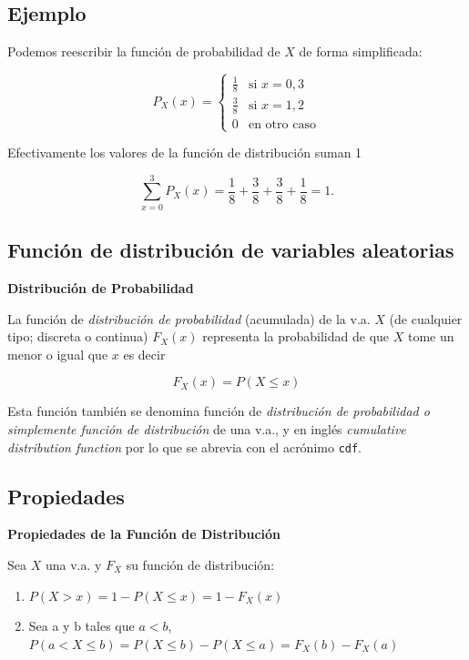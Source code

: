 \documentclass[]{book}
\providecommand{\tightlist}{%
  \setlength{\itemsep}{0pt}\setlength{\parskip}{0pt}}
\begin{document}
\hypertarget{ejemplo-10}{%
\subsection{Ejemplo}\label{ejemplo-10}}

Podemos reescribir la función de probabilidad de \(X\) de forma simplificada:

\[P_{X}(x)=\left\{\begin{array}{ll} \frac18 & \mbox{si } x=0, 3\\
\frac38 & \mbox{si } x=1,2\\ 0 & \mbox{en otro caso}\end{array}\right.\]

Efectivamente los valores de la función de distribución suman 1

\[\sum_{x=0}^3 P_X(x)= \frac18+\frac38+\frac38+\frac18=1.\]

\hypertarget{funciuxf3n-de-distribuciuxf3n-de-variables-aleatorias}{%
\subsection{Función de distribución de variables aleatorias}\label{funciuxf3n-de-distribuciuxf3n-de-variables-aleatorias}}

 \textbf{Distribución de Probabilidad}

La función de \emph{distribución de probabilidad} (acumulada) de la v.a. \(X\) (de cualquier tipo;
discreta o continua) \(F_{X}(x)\) representa la probabilidad de que \(X\) tome un menor o igual que \(x\) es decir

\[F_{X}(x)=P(X\leq x)\]

Esta función también se denomina función de \emph{distribución de
probabilidad o simplemente función de distribución} de una v.a., y en inglés
\emph{cumulative distribution function} por lo que se abrevia con el acrónimo \texttt{cdf}.

\hypertarget{propiedades-12}{%
\subsection{Propiedades}\label{propiedades-12}}

 \textbf{Propiedades de la Función de Distribución}

Sea \(X\) una v.a. y \(F_{X}\) su función
de distribución:

\begin{enumerate}
\def\labelenumi{\arabic{enumi}.}
\tightlist
\item
  \(P(X>x)=1-P(X\leq x)=1-F_{X}(x)\)
\item
  Sea a y b tales que \(a<b\), \(P(a<X\leq b)=P(X\leq b)-P(X\leq a)=F_{X}(b)-F_{X}(a)\)
\end{enumerate}
\end{document}
